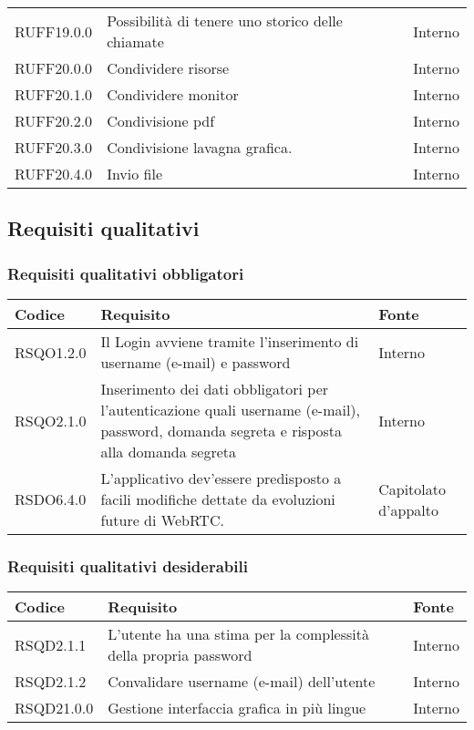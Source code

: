 \begin{center}
\begin{longtable}{lp{}l}
RUFF19.0.0 & Possibilità di tenere uno storico delle chiamate & Interno \\
RUFF20.0.0 & Condividere risorse & Interno \\
RUFF20.1.0 & Condividere monitor & Interno \\
RUFF20.2.0 & Condivisione pdf & Interno \\
RUFF20.3.0 & Condivisione lavagna grafica. & Interno \\
RUFF20.4.0 & Invio file & Interno \\
\bottomrule
\end{longtable}
\end{center}


\subsection{Requisiti qualitativi}

\subsubsection{Requisiti qualitativi obbligatori}

\begin{center}
\begin{longtable}{lp{}l}
\toprule Codice & Requisito & Fonte\\
\midrule
RSQO1.2.0 & Il Login avviene tramite l'inserimento di username (e-mail) e password & Interno \\
RSQO2.1.0 & Inserimento dei dati obbligatori per l'autenticazione quali username (e-mail), password, domanda segreta e risposta alla domanda segreta & Interno \\
RSDO6.4.0 & L'applicativo dev'essere predisposto a facili modifiche dettate da evoluzioni future di WebRTC. & Capitolato d'appalto \\
\bottomrule
\end{longtable}
\end{center}

\subsubsection{Requisiti qualitativi desiderabili}

\begin{center}
\begin{longtable}{lp{}l}
\toprule Codice & Requisito & Fonte\\
\midrule
RSQD2.1.1 & L'utente ha una stima per la complessità della propria password & Interno \\
RSQD2.1.2 & Convalidare username (e-mail) dell'utente & Interno \\
RSQD21.0.0 & Gestione interfaccia grafica in più lingue & Interno \\
\bottomrule
\end{longtable}
\end{center}

